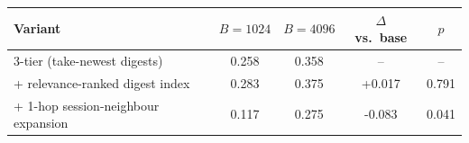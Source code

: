 \begin{tabular}{lcccc}
\toprule
Variant & $B{=}1024$ & $B{=}4096$ & $\Delta$ vs.\ base & $p$ \\
\midrule
3-tier (take-newest digests) & 0.258 & 0.358 & -- & -- \\
+ relevance-ranked digest index & 0.283 & 0.375 & +0.017 & 0.791 \\
+ 1-hop session-neighbour expansion & 0.117 & 0.275 & -0.083 & 0.041 \\
\bottomrule
\end{tabular}